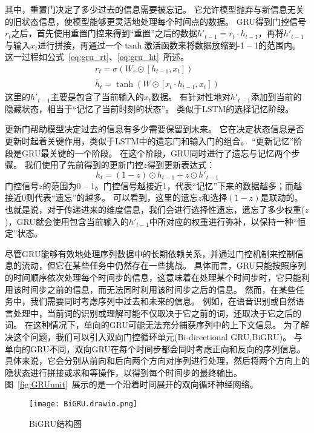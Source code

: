 其中，重置门决定了多少过去的信息需要被忘记。
它允许模型抛弃与新信息无关的旧状态信息，使模型能够更灵活地处理每个时间点的数据。
GRU得到门控信号$r_t$之后，首先使用重置门控来得到“重置”之后的数据$h'_{t-1} = r_t \cdot h_{t-1}$，再将$h'_{t-1}$与输入$x_t$进行拼接，再通过一个$\tanh$激活函数来将数据放缩到-1 -- 1的范围内。
这一过程如公式~\ref{eq:gru_rt}、\ref{eq:gru_ht}~所述。
\begin{gather}
  r_t = σ(W_r \odot [h_{t-1},x_t]) \label{eq:gru_rt} \\
  \tilde{h_t} = \tanh(W \odot [r_t \cdot h_{t-1} , x_t]) \label{eq:gru_ht}
\end{gather}
这里的$h'_{t-1}$主要是包含了当前输入的$x_t$数据。
有针对性地对$h'_{t-1}$添加到当前的隐藏状态，相当于“记忆了当前时刻的状态”。
类似于LSTM的选择记忆阶段。


更新门帮助模型决定过去的信息有多少需要保留到未来。
它在决定状态信息是否更新时起着关键作用，类似于LSTM中的遗忘门和输入门的组合。
“更新记忆”阶段是GRU最关键的一个阶段。
在这个阶段，GRU同时进行了遗忘与记忆两个步骤。
我们使用了先前得到的更新门控$z$得到更新表达式： 
\begin{equation}
  \label{dq:gru_ht}
  h_t = (1-z) \odot h_{t-1} + z \odot h'_{t-1}
\end{equation}
门控信号$z$的范围为0 -- 1。门控信号越接近1，代表“记忆”下来的数据越多；而越接近0则代表“遗忘”的越多。
可以看到，这里的遗忘$z$和选择$(1-z)$是联动的。
也就是说，对于传递进来的维度信息，我们会进行选择性遗忘，遗忘了多少权重($z$)，GRU就会使用包含当前输入的$h'_{t-1}$中所对应的权重进行弥补，以保持一种“恒定”状态。


尽管GRU能够有效地处理序列数据中的长期依赖关系，并通过门控机制来控制信息的流动，但它在某些任务中仍然存在一些挑战。
具体而言，GRU只能按照序列的时间顺序依次处理每个时间步的信息，这意味着在处理某个时间步时，它只能利用该时间步之前的信息，而无法同时利用该时间步之后的信息。
然而，在某些任务中，我们需要同时考虑序列中过去和未来的信息。
例如，在语音识别或自然语言处理中，当前词的识别或理解可能不仅取决于它之前的词，还取决于它之后的词。
在这种情况下，单向的GRU可能无法充分捕获序列中的上下文信息。
为了解决这个问题，我们可以引入双向门控循环单元(Bi-directional GRU,BiGRU)。
与单向的GRU不同，双向GRU在每个时间步都会同时考虑正向和反向的序列信息。
具体来说，它会分别从前向和后向两个方向对序列进行处理，然后将两个方向上的隐状态进行拼接或求和等操作，以得到每个时间步的最终输出。
图~\ref{fig:GRUunit}~展示的是一个沿着时间展开的双向循环神经网络。
\begin{figure}[h]
  \centering
  \texttt{[image: BiGRU.drawio.png]}
  \caption{BiGRU结构图}
  \label{fig:BiGRU}
\end{figure}

